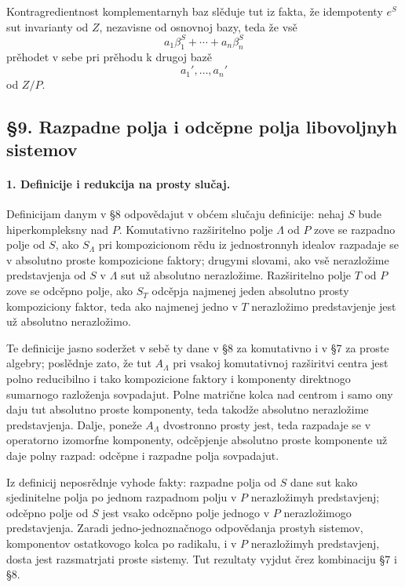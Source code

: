 \documentclass[11pt]{article}
\begin{document}
Kontragredientnost komplementarnyh baz slěduje tut iz fakta, že idempotenty \(e^S\) sut invarianty od \(Z\), nezavisne od osnovnoj bazy, teda že vsě
\[
        a_1\beta_1^S+\cdots+a_n\beta_n^S
\]
prěhodet v sebe pri prěhodu k drugoj bazě
\[
        a_1',\ldots,a_n'
\]
od \(Z/P\).

\subsection*{§9. Razpadne polja i odcěpne polja libovoljnyh sistemov}

\paragraph{1. Definicije i redukcija na prosty slučaj.}
Definicijam danym v §8 odpovědajut v obćem slučaju definicije: nehaj \(S\) bude hiperkompleksny nad \(P\). Komutativno razširitelno polje \(\Lambda\) od \(P\) zove se razpadno polje od \(S\), ako \(S_\Lambda\) pri kompozicionom rědu iz jednostronnyh idealov razpadaje se v absolutno proste kompozicione faktory; drugymi slovami, ako vsě nerazložime predstavjenja od \(S\) v \(\Lambda\) sut už absolutno nerazložime. Razširitelno polje \(T\) od \(P\) zove se odcěpno polje, ako \(S_T\) odcěpja najmenej jeden absolutno prosty kompoziciony faktor, teda ako najmenej jedno v \(T\) nerazložimo predstavjenje jest už absolutno nerazložimo.

Te definicije jasno soderžet v sebě ty dane v §8 za komutativno i v §7 za proste algebry; poslědnje zato, že tut \(A_\Lambda\) pri vsakoj komutativnoj razširitvi centra jest polno reducibilno i tako kompozicione faktory i komponenty direktnogo sumarnogo razloženja sovpadajut. Polne matrične kolca nad centrom i samo ony daju tut absolutno proste komponenty, teda takodže absolutno nerazložime predstavjenja. Dalje, poneže \(A_\Lambda\) dvostronno prosty jest, teda razpadaje se v operatorno izomorfne komponenty, odcěpjenje absolutno proste komponente už daje polny razpad: odcěpne i razpadne polja sovpadajut.

Iz definicij neposrědnje vyhode fakty: razpadne polja od \(S\) dane sut kako sjedinitelne polja po jednom razpadnom polju v \(P\) nerazložimyh predstavjenj; odcěpno polje od \(S\) jest vsako odcěpno polje jednogo v \(P\) nerazložimogo predstavjenja. Zaradi jedno-jednoznačnogo odpovědanja prostyh sistemov, komponentov ostatkovogo kolca po radikalu, i v \(P\) nerazložimyh predstavjenj, dosta jest razsmatrjati proste sistemy. Tut rezultaty vyjdut črez kombinaciju §7 i §8.
\end{document}
